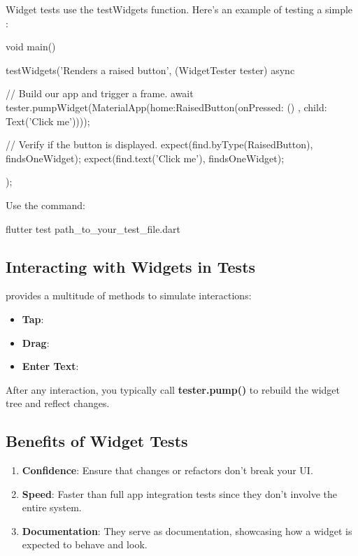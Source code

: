 Widget tests use the testWidgets function. Here's an example of testing a simple :

\begin{dartcode}
void main() {
  testWidgets('Renders a raised button', (WidgetTester tester) async {
    // Build our app and trigger a frame.
    await tester.pumpWidget(MaterialApp(home:RaisedButton(onPressed: () {}, child: Text('Click me'))));

    // Verify if the button is displayed.
    expect(find.byType(RaisedButton), findsOneWidget);
    expect(find.text('Click me'), findsOneWidget);
  });
}
\end{dartcode}

Use the command:
\begin{bashcode}
flutter test path_to_your_test_file.dart
\end{bashcode}

\subsection*{Interacting with Widgets in Tests}
 provides a multitude of methods to simulate interactions:

\begin{itemize}
 \item \textbf{Tap}: 
 \item \textbf{Drag}: 
 \item \textbf{Enter Text}: 
\end{itemize}
After any interaction, you typically call \textbf{tester.pump()} to rebuild the widget tree and reflect changes.

\subsection*{Benefits of Widget Tests}
\begin{enumerate}
 \item \textbf{Confidence}: Ensure that changes or refactors don't break your UI.
 \item \textbf{Speed}: Faster than full app integration tests since they don't involve the entire system.
 \item \textbf{Documentation}: They serve as documentation, showcasing how a widget is expected to behave and look.
\end{enumerate}

